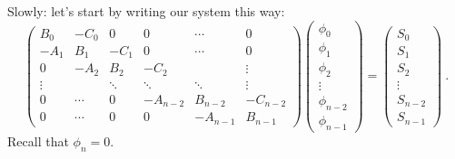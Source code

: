 \documentclass[12pt]{article}
\begin{document}
Slowly: let's start by writing our system this way:
%
\begin{equation}
\begin{pmatrix}
B_0  & -C_0 & 0    & 0    & \cdots & 0 \\
-A_1 & B_1  & -C_1 & 0    & \cdots & 0 \\
0    & -A_2 & B_2  & -C_2 & & \vdots \\
\vdots        &    & \ddots  & \ddots & \ddots & \vdots \\
0 & \cdots & 0 & -A_{n-2} & B_{n-2} & -C_{n-2} \\
0        & \cdots   & 0   & 0 & -A_{n-1} & B_{n-1} 
\end{pmatrix}
%
\begin{pmatrix}\phi_0 \\ \phi_1 \\ \phi_2 \\ \vdots \\ \phi_{n-2} \\ \phi_{n-1} \end{pmatrix} =
%
\begin{pmatrix}S_0 \\ S_1 \\ S_2 \\ \vdots \\ S_{n-2} \\ S_{n-1} \end{pmatrix} \:. \nonumber
\end{equation}
%
Recall that $\phi_n = 0$. 
\end{document}
